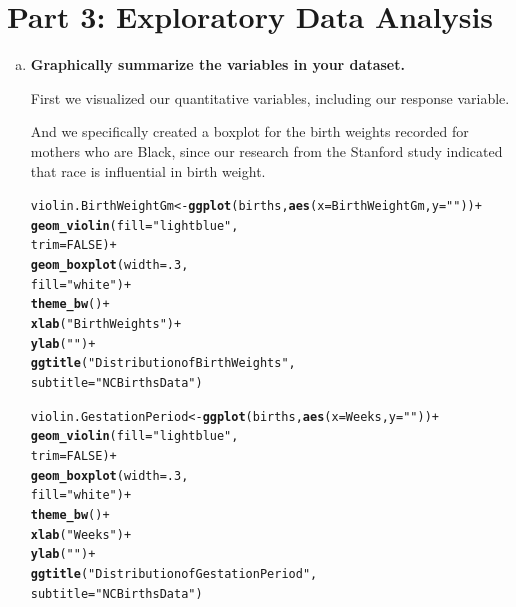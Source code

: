 \documentclass{article}\usepackage[]{graphicx}\usepackage[]{xcolor}
\makeatletter
\newcommand{\hlnum}[1]{\textcolor[rgb]{0.686,0.059,0.569}{#1}}%
\newcommand{\hlstr}[1]{\textcolor[rgb]{0.192,0.494,0.8}{#1}}%
\newcommand{\hlopt}[1]{\textcolor[rgb]{0,0,0}{#1}}%
\newcommand{\hlstd}[1]{\textcolor[rgb]{0.345,0.345,0.345}{#1}}%
\newcommand{\hlkwb}[1]{\textcolor[rgb]{0.69,0.353,0.396}{#1}}%
\newcommand{\hlkwc}[1]{\textcolor[rgb]{0.333,0.667,0.333}{#1}}%
\newcommand{\hlkwd}[1]{\textcolor[rgb]{0.737,0.353,0.396}{\textbf{#1}}}%
\newenvironment{kframe}{%
 \def\at@end@of@kframe{}%
 \ifinner\ifhmode%
  \def\at@end@of@kframe{\end{minipage}}%
  \begin{minipage}{\columnwidth}%
 \fi\fi%
 \def\FrameCommand##1{\hskip\@totalleftmargin \hskip-\fboxsep
 \colorbox{shadecolor}{##1}\hskip-\fboxsep
     \hskip-\linewidth \hskip-\@totalleftmargin \hskip\columnwidth}%
 \MakeFramed {\advance\hsize-\width
   \@totalleftmargin\z@ \linewidth\hsize
   \@setminipage}}%
 {\par\unskip\endMakeFramed%
 \at@end@of@kframe}
\newenvironment{knitrout}{}{} %
\makeatother
\begin{document}
\section{Part 3: Exploratory Data Analysis}
\begin{enumerate}[a.]
\item\textbf{Graphically summarize the variables in your dataset.}

First we visualized our quantitative variables, including our response variable. 

And we specifically created a boxplot for the birth weights recorded for mothers who are Black, since our research from the Stanford study indicated that race is influential in birth weight.

\begin{knitrout}
\color{fgcolor}\begin{kframe}
\begin{alltt}
\hlstd{violin.BirthWeightGm} \hlkwb{<-} \hlkwd{ggplot}\hlstd{(births,} \hlkwd{aes}\hlstd{(}\hlkwc{x}\hlstd{=BirthWeightGm,} \hlkwc{y}\hlstd{=}\hlstr{""}\hlstd{))}\hlopt{+}
  \hlkwd{geom_violin}\hlstd{(}\hlkwc{fill} \hlstd{=} \hlstr{"lightblue"}\hlstd{,}
              \hlkwc{trim} \hlstd{=} \hlnum{FALSE}\hlstd{)}\hlopt{+}
  \hlkwd{geom_boxplot}\hlstd{(}\hlkwc{width} \hlstd{=} \hlnum{.3}\hlstd{,}
               \hlkwc{fill} \hlstd{=} \hlstr{"white"}\hlstd{)} \hlopt{+}
  \hlkwd{theme_bw}\hlstd{()}\hlopt{+}
  \hlkwd{xlab}\hlstd{(}\hlstr{"Birth Weights"}\hlstd{)}\hlopt{+}
  \hlkwd{ylab}\hlstd{(}\hlstr{" "}\hlstd{)}\hlopt{+}
  \hlkwd{ggtitle}\hlstd{(}\hlstr{"Distribution of Birth Weights"}\hlstd{,}
          \hlkwc{subtitle} \hlstd{=} \hlstr{"NCBirths Data"}\hlstd{)}


\hlstd{violin.GestationPeriod} \hlkwb{<-} \hlkwd{ggplot}\hlstd{(births,} \hlkwd{aes}\hlstd{(}\hlkwc{x}\hlstd{=Weeks,} \hlkwc{y}\hlstd{=}\hlstr{""}\hlstd{))}\hlopt{+}
  \hlkwd{geom_violin}\hlstd{(}\hlkwc{fill} \hlstd{=} \hlstr{"lightblue"}\hlstd{,}
              \hlkwc{trim} \hlstd{=} \hlnum{FALSE}\hlstd{)}\hlopt{+}
  \hlkwd{geom_boxplot}\hlstd{(}\hlkwc{width} \hlstd{=} \hlnum{.3}\hlstd{,}
               \hlkwc{fill} \hlstd{=} \hlstr{"white"}\hlstd{)} \hlopt{+}
  \hlkwd{theme_bw}\hlstd{()}\hlopt{+}
  \hlkwd{xlab}\hlstd{(}\hlstr{"Weeks"}\hlstd{)}\hlopt{+}
  \hlkwd{ylab}\hlstd{(}\hlstr{" "}\hlstd{)}\hlopt{+}
  \hlkwd{ggtitle}\hlstd{(}\hlstr{"Distribution of Gestation Period"}\hlstd{,}
          \hlkwc{subtitle} \hlstd{=} \hlstr{"NCBirths Data"}\hlstd{)}



\end{alltt}
\end{kframe}
\end{knitrout}
\end{enumerate}
\end{document}
